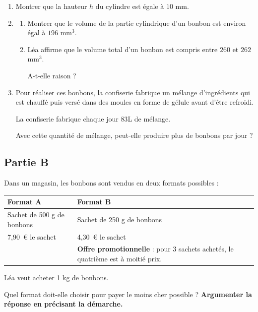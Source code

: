 
\begin{enumerate}
	\item Montrer que la hauteur $h$ du cylindre est égale à $10$ mm.
	\item[2.] \begin{enumerate}[label=\alph*.]
		\item Montrer que le volume de la partie cylindrique d'un bonbon est environ égal à $196$ mm$^3$.
		\item Léa affirme que le volume total d'un bonbon est compris entre $260$ et $262$ mm$^3$.

		A-t-elle raison ?
	\end{enumerate}
	\item[3.] Pour réaliser ces bonbons, la confiserie fabrique un mélange d'ingrédients qui est chauffé puis versé dans des moules en forme de gélule avant d'être refroidi.

	La confiserie fabrique chaque jour $83$L de mélange.

	Avec cette quantité de mélange, peut-elle produire plus de  bonbons par jour ?
\end{enumerate}

\subsection*{Partie B}

Dans un magasin, les bonbons sont vendus en deux formats possibles :

\begin{center}
	\begin{tabular}{|m{7cm}|m{7cm}|}\hline
		\textbf{Format A} & \textbf{Format B} \\ \hline
		Sachet de 500 g de bonbons & Sachet de 250 g de bonbons\\
		7,90~\euro{} le sachet & 4,30~\euro{} le sachet \\
		&\textbf{Offre promotionnelle} : pour 3 sachets
		achetés, le quatrième est à moitié prix.\\ \hline
	\end{tabular}
\end{center}

Léa veut acheter 1 kg de bonbons.

Quel format doit-elle choisir pour payer le moins cher possible ? \textbf{Argumenter la réponse en précisant la démarche.}
